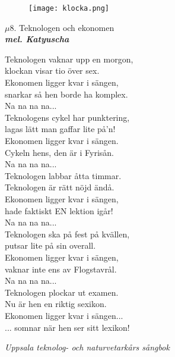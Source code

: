 \documentclass[a6paper,10pt]{article}
\newcommand{\mel}[1]{\small\textbf{\textit{mel. #1 \\}}}
\begin{document}
\vspace{20pt}
\begin{figure}[!h]
\hspace{30pt}
\texttt{[image: klocka.png]}
\end{figure}

\setlength{\oddsidemargin}{-0.37in}
\noindent
\begin{center}
\Large $\mu$8. Teknologen och ekonomen\\
\mel{Katyuscha}
\end{center}
Teknologen vaknar upp en morgon, \\
klockan visar tio över sex. \\
Ekonomen ligger kvar i sängen, \\
snarkar så hen borde ha komplex.
\vspace{5pt} \\
Na na na na...
\vspace{5pt} \\
Teknologens cykel har punktering, \\
lagas lätt man gaffar lite på’n! \\
Ekonomen ligger kvar i sängen. \\
Cykeln hens, den är i Fyrisån.
\vspace{5pt} \\
Na na na na... 
\vspace{5pt} \\
Teknologen labbar åtta timmar. \\
Teknologen är rätt nöjd ändå. \\
Ekonomen ligger kvar i sängen, \\
hade faktiskt EN lektion igår!
\vspace{5pt} \\
Na na na na...
\vspace{5pt} \\
Teknologen ska på fest på kvällen, \\
putsar lite på sin overall. \\
Ekonomen ligger kvar i sängen, \\
vaknar inte ens av Flogstavrål.
\vspace{5pt} \\
Na na na na... 
\vspace{5pt} \\
Teknologen plockar ut examen. \\
Nu är hen en riktig sexikon. \\
Ekonomen ligger kvar i sängen... \\
... somnar när hen ser sitt lexikon! 
\begin{flushright}
\textit{Uppsala teknolog- och naturvetarkårs sångbok}
\end{flushright}
\end{document}
